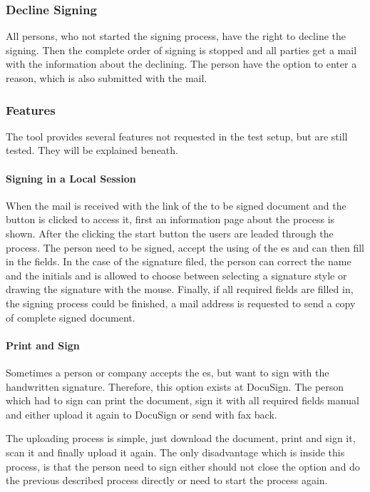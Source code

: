 \subsubsection{Decline Signing}
All persons, who not started the signing process, have the right to decline the signing. Then the complete order of signing is stopped and all parties get a mail with the information about the declining. The person have the option to enter a reason, which is also submitted with the mail.

\subsubsection{Features}
The tool provides several features not requested in the test setup, but are still tested. They will be explained beneath.
\paragraph{Signing in a Local Session}
When the mail is received with the link of the to be signed document and the button is clicked to access it, first an information page about the process is shown. After the clicking the start button the users are leaded through the process. The person need to be signed, accept the using of the \gls{es} and can then fill in the fields. In the case of the signature filed, the person can correct the name and the initials and is allowed to choose between selecting a signature style or drawing the signature with the mouse. Finally, if all required fields are filled in, the signing process could be finished, a mail address is requested to send a copy of complete signed document. 

\paragraph{Print and Sign}
Sometimes a person or company accepts the \gls{es}, but want to sign with the handwritten signature. Therefore, this option exists at DocuSign. The person which had to sign can print the document, sign it with all required fields manual and either upload it again to DocuSign or send with fax back.

The uploading process is simple, just download the document, print and sign it, scan it and finally upload it again. The only disadvantage which is inside this process, is that the person need to sign either should not close the option and do the previous described process directly or need to start the process again. 

